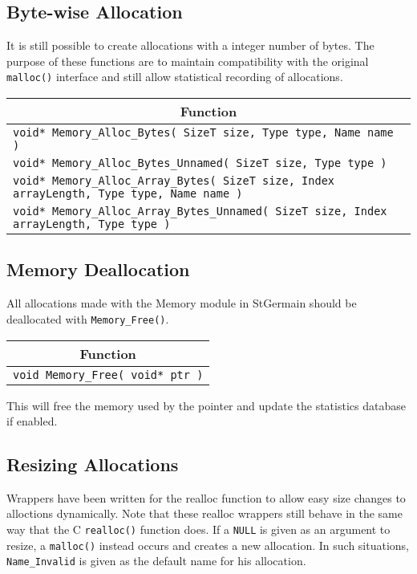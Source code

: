 \documentclass[a4paper,12pt]{article}
\begin{document}
\subsection{Byte-wise Allocation}
It is still possible to create allocations with a integer number of bytes. 
The purpose of these functions are to maintain compatibility with the original 
\texttt{malloc()} interface and still allow statistical recording of allocations.

\begin{table}[h]
  \begin{tabular}{|p{13.3cm}|}
    \hline \multicolumn{1}{|c|}{\textbf{Function}} \\ \hline
    \texttt{void* Memory\_Alloc\_Bytes( SizeT size, Type type, Name name )} \\ \hline
    \texttt{void* Memory\_Alloc\_Bytes\_Unnamed( SizeT size, Type type )} \\ \hline
    \texttt{void* Memory\_Alloc\_Array\_Bytes( SizeT size, Index arrayLength, Type type, Name name )} \\ \hline
    \texttt{void* Memory\_Alloc\_Array\_Bytes\_Unnamed( SizeT size, Index arrayLength, Type type )} \\ \hline
  \end{tabular}
\end{table}

\subsection{Memory Deallocation}
All allocations made with the Memory module in StGermain should be 
deallocated with \texttt{Memory\_Free()}.

\begin{table}[h]
  \begin{tabular}{|p{13.3cm}|}
    \hline \multicolumn{1}{|c|}{\textbf{Function}} \\ \hline
    \texttt{void Memory\_Free( void* ptr )} \\ \hline
  \end{tabular}
\end{table}

This will free the memory used by the pointer and update the statistics 
database if enabled.

\subsection{Resizing Allocations}
Wrappers have been written for the realloc function to allow easy size changes to alloctions dynamically. Note that these realloc wrappers still behave in the same way that the C \texttt{realloc()} function does. If a \texttt{NULL} is given as an argument to resize, a \texttt{malloc()} instead occurs and creates a new allocation. In such situations, \texttt{Name\_Invalid} is given as the default name for his allocation.
\end{document}
